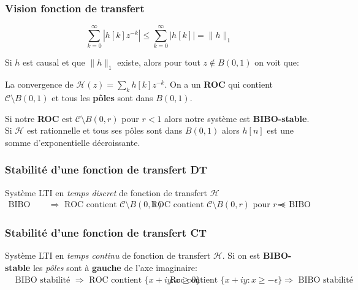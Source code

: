 \documentclass{report}
\begin{document}
\subsubsection{Vision fonction de transfert}
\begin{figure}
\centering
\begin{equation}
\sum_{k=0}^{\infty} |h[k] z^{-k}| \leqslant \sum_{k=0}^{\infty} |h[k]| = \parallel h \parallel_1
\end{equation}
\end{figure}
Si $h$ est causal et que $\parallel h \parallel_1$ existe, alors pour tout $z \notin B(0,1)$ on voit que:\par 
La convergence de $\mathcal{H}(z) = \sum_k h[k] z^{-k}$. On a un \textbf{ROC} qui contient $\mathcal{C}\setminus B(0,1)$ et tous les \textbf{pôles} sont dans $B(0,1)$.\par 
Si notre \textbf{ROC} est $\mathcal{C}\setminus B(0,r)$ pour $r< 1$ alors notre système est \textbf{BIBO-stable}. Si $\mathcal{H}$ est rationnelle et tous ses pôles sont dans $B(0,1)$ alors $h[n]$ est une somme d'exponentielle décroissante.

\subsubsection{Stabilité d'une fonction de transfert DT}
Système LTI en \textit{temps discret} de fonction de transfert $\mathcal{H}$
\begin{align}
\text{BIBO stabilité } &\Rightarrow \text{ ROC contient } \mathcal{C}\setminus B(0,1) &  \text{ ROC contient } \mathcal{C}\setminus B(0,r) \text{ pour } r<1 & \Rightarrow \text{ BIBO stabilité}
\end{align}

\subsubsection{Stabilité d'une fonction de transfert CT}
Système LTI en \textit{temps continu} de fonction de transfert $\mathcal{H}$. Si on est \textbf{BIBO-stable} les \textit{pôles} sont à \textbf{gauche} de l'axe imaginaire:
\begin{align}
&\text{BIBO stabilité } \Rightarrow \text{ ROC contient } \{x+iy: x \geqslant 0\} & &\text{ Roc contient } \{x + iy : x \geqslant - \epsilon\} \Rightarrow \text{ BIBO stabilité}
\end{align}
\end{document}
